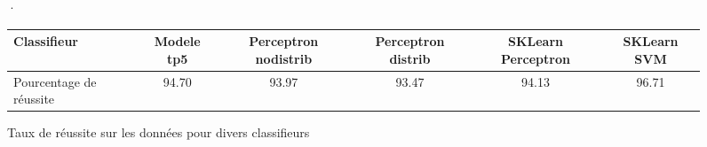 \begin{figure}[H] ·
  \begin{adjustbox}{width=\textwidth}
    
  \begin{tabular}{ |l|| *{5}{c|} }\hline
    
Classifieur   & Modele tp5 & Perceptron nodistrib & Perceptron distrib
& SKLearn Perceptron & SKLearn SVM \\ \hline
Pourcentage de réussite   & 94.70 & 93.97 & 93.47 & 94.13 & 96.71 \\ \hline
  \end{tabular}
    \end{adjustbox}
  \caption{Taux de réussite sur les données pour divers classifieurs}

\end{figure}
